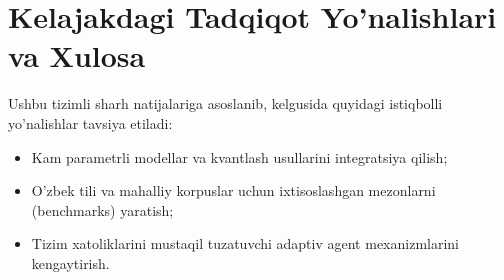 \section{Kelajakdagi Tadqiqot Yo'nalishlari va Xulosa}
Ushbu tizimli sharh natijalariga asoslanib, kelgusida quyidagi istiqbolli yo'nalishlar tavsiya etiladi:
\begin{itemize}
  \item Kam parametrli modellar va kvantlash usullarini integratsiya qilish;
  \item O'zbek tili va mahalliy korpuslar uchun ixtisoslashgan mezonlarni (benchmarks) yaratish;
  \item Tizim xatoliklarini mustaqil tuzatuvchi adaptiv agent mexanizmlarini kengaytirish.
\end{itemize}
